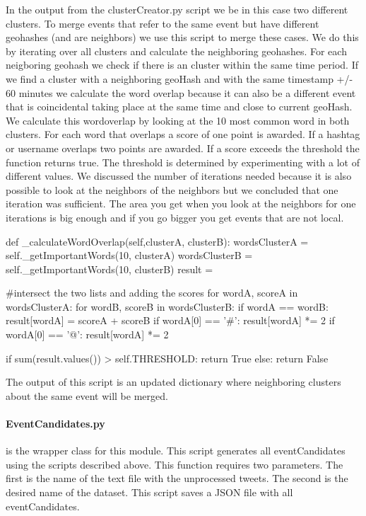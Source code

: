 \documentclass[
10pt, %
a4paper, %
oneside, %
headinclude,footinclude, %
BCOR5mm, %
]{scrartcl}
\begin{document}
In the output from the clusterCreator.py script we be in this case two different clusters. To merge events that refer to the same event but have different geohashes (and are neighbors) we use this script to merge these cases. We do this by iterating over all clusters and calculate the neighboring geohashes. For each neigboring geohash we check if there is an cluster within the same time period. If we find a cluster with a neighboring geoHash and with the same timestamp +/- 60 minutes we calculate the word overlap because it can also be a different event that is coincidental taking place at the same time and close to current geoHash. We calculate this wordoverlap by looking at the 10 most common word in both clusters. For each word that overlaps a score of one point is awarded. If a hashtag or username overlaps two points are awarded. If a score exceeds the threshold the function returns true. The threshold is determined by experimenting with a lot of different values.\newline
We discussed the number of iterations needed because it is also possible to look at the neighbors of the neighbors but we concluded that one iteration was sufficient. The area you get when you look at the neighbors for one iterations is big enough and if you go bigger you get events that are not local.



\begin{python}
def _calculateWordOverlap(self,clusterA, clusterB):      
    wordsClusterA = self._getImportantWords(10, clusterA)
    wordsClusterB = self._getImportantWords(10, clusterB)
    result = {}
    
    #intersect the two lists and adding the scores
    for wordA, scoreA in wordsClusterA:
        for wordB, scoreB in wordsClusterB:
            if wordA == wordB:
                result[wordA] = scoreA + scoreB
                if wordA[0] == '#':
                    result[wordA] *= 2
                if wordA[0] == '@':
                    result[wordA] *= 2

    if sum(result.values()) > self.THRESHOLD:
        return True
    else:
        return False
\end{python}

The output of this script is an updated dictionary where neighboring clusters about the same event will be merged.

\paragraph{EventCandidates.py} is the wrapper class for this module. This script generates all eventCandidates using the scripts described above. This function requires two parameters. The first is the name of the text file with the unprocessed tweets. The second is the desired name of the dataset. This script saves a JSON file with all eventCandidates.
\end{document}
